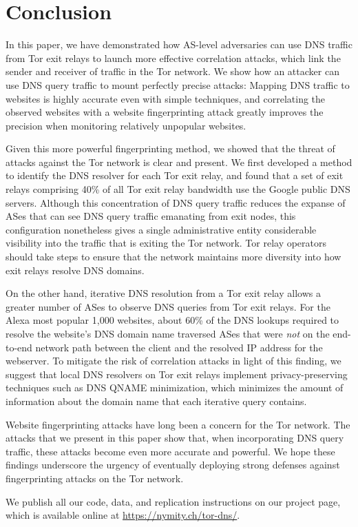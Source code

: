 \section{Conclusion}
\label{sec:conclusion}

In this paper, we have demonstrated how AS-level adversaries can use DNS
traffic from Tor exit relays to launch more effective correlation
attacks, which link the sender and receiver of traffic in the Tor
network.  We show how an attacker can use DNS query traffic to mount
perfectly precise \name attacks: Mapping DNS traffic to websites is highly
accurate even with simple techniques, and correlating the observed websites
with a website fingerprinting attack greatly improves the precision when
monitoring relatively unpopular websites. 

Given this more powerful fingerprinting method, we showed that the
threat of \name attacks against the Tor network is clear and present. We
first developed a method to identify the DNS resolver for each Tor exit relay,
and found that a set of exit relays comprising 40\% of all Tor exit
relay bandwidth use the Google public DNS servers. Although this
concentration of DNS query traffic reduces the expanse of ASes that can
see DNS query traffic emanating from exit nodes, this configuration
nonetheless gives a single administrative entity considerable visibility
into the traffic that is exiting the Tor network. Tor relay operators should
take steps to ensure that the network maintains more diversity into how
exit relays resolve DNS domains.

On the other hand, iterative DNS resolution from a Tor exit relay allows
a greater number of ASes to observe DNS queries from Tor exit relays.
For the Alexa most popular 1,000 websites, about 60\% of the DNS lookups
required to resolve the website's DNS domain name traversed ASes that
were {\em not} on the end-to-end network path between the client and the
resolved IP address for the webserver.  To mitigate the risk of
correlation attacks in light of this finding, we suggest that local DNS
resolvers on Tor exit relays implement privacy-preserving techniques
such as DNS QNAME minimization, which minimizes the amount of
information about the domain name that each iterative query contains.

Website fingerprinting attacks have long been a concern for the Tor
network. The attacks that we present in this paper show that, when
incorporating DNS query traffic, these attacks become even more accurate
and powerful. We hope these findings underscore the urgency of
eventually deploying strong defenses against fingerprinting attacks on
the Tor network.

We publish all our code, data, and replication instructions on our project page,
which is available online at \url{https://nymity.ch/tor-dns/}.
